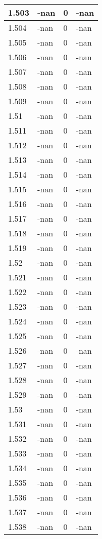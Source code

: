 \documentclass[a4paper,14pt]{extarticle}
\begin{document}
\begin{longtable}{||m{3cm}||m{3cm}|m{3cm}||m{3cm}||}
\hline
1.503 & -nan & 0 & -nan\\
\hline
1.504 & -nan & 0 & -nan\\
\hline
1.505 & -nan & 0 & -nan\\
\hline
1.506 & -nan & 0 & -nan\\
\hline
1.507 & -nan & 0 & -nan\\
\hline
1.508 & -nan & 0 & -nan\\
\hline
1.509 & -nan & 0 & -nan\\
\hline
1.51 & -nan & 0 & -nan\\
\hline
1.511 & -nan & 0 & -nan\\
\hline
1.512 & -nan & 0 & -nan\\
\hline
1.513 & -nan & 0 & -nan\\
\hline
1.514 & -nan & 0 & -nan\\
\hline
1.515 & -nan & 0 & -nan\\
\hline
1.516 & -nan & 0 & -nan\\
\hline
1.517 & -nan & 0 & -nan\\
\hline
1.518 & -nan & 0 & -nan\\
\hline
1.519 & -nan & 0 & -nan\\
\hline
1.52 & -nan & 0 & -nan\\
\hline
1.521 & -nan & 0 & -nan\\
\hline
1.522 & -nan & 0 & -nan\\
\hline
1.523 & -nan & 0 & -nan\\
\hline
1.524 & -nan & 0 & -nan\\
\hline
1.525 & -nan & 0 & -nan\\
\hline
1.526 & -nan & 0 & -nan\\
\hline
1.527 & -nan & 0 & -nan\\
\hline
1.528 & -nan & 0 & -nan\\
\hline
1.529 & -nan & 0 & -nan\\
\hline
1.53 & -nan & 0 & -nan\\
\hline
1.531 & -nan & 0 & -nan\\
\hline
1.532 & -nan & 0 & -nan\\
\hline
1.533 & -nan & 0 & -nan\\
\hline
1.534 & -nan & 0 & -nan\\
\hline
1.535 & -nan & 0 & -nan\\
\hline
1.536 & -nan & 0 & -nan\\
\hline
1.537 & -nan & 0 & -nan\\
\hline
1.538 & -nan & 0 & -nan\\

\end{longtable}
\end{document}
